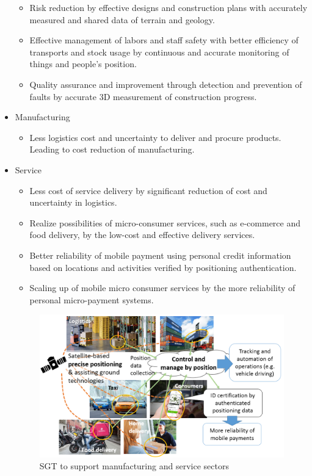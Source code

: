 \begin{itemize}
\begin{itemize}
\item Risk reduction by effective designs and construction plans with accurately measured and shared data of terrain and geology.
\item Effective management of labors and staff safety with better efficiency of transports and stock usage by continuous and accurate monitoring of things and people’s position.
\item Quality assurance and improvement through detection and prevention of faults by accurate 3D measurement of construction progress.
\end{itemize}

\item Manufacturing

\begin{itemize}
\item Less logistics cost and uncertainty to deliver and procure products. Leading to cost reduction of manufacturing.
\end{itemize}

\item Service

\begin{itemize}
\item Less cost of service delivery by significant reduction of cost and uncertainty in logistics.
\item Realize possibilities of micro-consumer services, such as e-commerce and food delivery, by the low-cost and effective delivery services.
\item Better reliability of mobile payment using personal credit information based on locations and activities verified by positioning authentication. 
\item Scaling up of mobile micro consumer services by the more reliability of personal micro-payment systems.
\end{itemize}

\begin{figure}[H]
\begin{center}
\includegraphics[width = 0.8\linewidth]{Figures/manufacturing_service.png}
\end{center}
\caption{SGT to support manufacturing and service sectors}
\label{manufacturing_service}
\end{figure}


\end{itemize}
